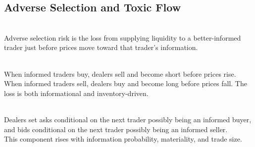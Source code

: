 \subsection{Adverse Selection and Toxic Flow}

\begin{definition} \\
Adverse selection risk is the loss from supplying liquidity to a better-informed trader just before prices move toward that trader's information.
\end{definition}

\begin{mechanism} \\
When informed traders buy, dealers sell and become short before prices rise. When informed traders sell, dealers buy and become long before prices fall. The loss is both informational and inventory-driven.
\end{mechanism}

\begin{principle} \\
Dealers set asks conditional on the next trader possibly being an informed buyer, and bids conditional on the next trader possibly being an informed seller.\\
This component rises with information probability, materiality, and trade size.
\end{principle}

